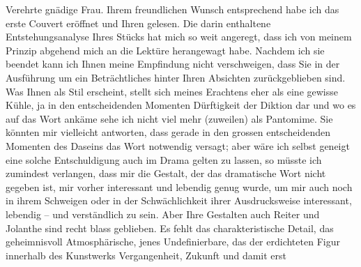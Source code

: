 \pstart\center{}Verehrte gnädige Frau.\pend\vspace{0.5em}
\pstart
           Ihrem freundlichen Wunsch entsprechend habe ich das erste Couvert eröffnet und Ihren
                  \label{K_L04340-1v}\label{K_L04340-1}
               gelesen. Die darin enthaltene Entstehungsanalyse Ihres Stücks hat mich so weit angeregt, dass ich
               von meinem Prinzip abgehend mich an die Lektüre herangewagt habe. Nachdem ich sie beendet kann ich
               Ihnen meine Empfindung nicht verschweigen, dass Sie in der Ausführung um ein
               Beträchtliches hinter Ihren Absichten zurückgeblieben sind. Was Ihnen als Stil
               erscheint, stellt sich meines Erachtens eher als eine gewisse Kühle, ja in den
               entscheidenden Momenten Dürftigkeit der Diktion dar und wo es auf das Wort ankäme
               sehe ich nicht viel mehr (zuweilen) als Pantomime. Sie könnten mir vielleicht
               antworten, dass gerade in den grossen entscheidenden Momenten des Daseins das Wort
               notwendig versagt; aber wäre ich selbst {\pb}geneigt eine solche Entschuldigung auch im Drama gelten zu lassen, so müsste ich
               zumindest verlangen, dass mir die Gestalt, der das dramatische Wort nicht gegeben
               ist, mir vorher interessant und lebendig genug wurde, um mir auch noch in ihrem
               Schweigen oder in der Schwächlichkeit ihrer Ausdrucksweise interessant, lebendig –
               und verständlich zu sein. Aber Ihre Gestalten auch Reiter und Jolanthe sind recht blass geblieben. Es fehlt das
               charakteristische Detail, das geheimnisvoll Atmosphärische, jenes Undefinierbare, das
               der erdichteten Figur innerhalb des Kunstwerks Vergangenheit, Zukunft und damit erst
